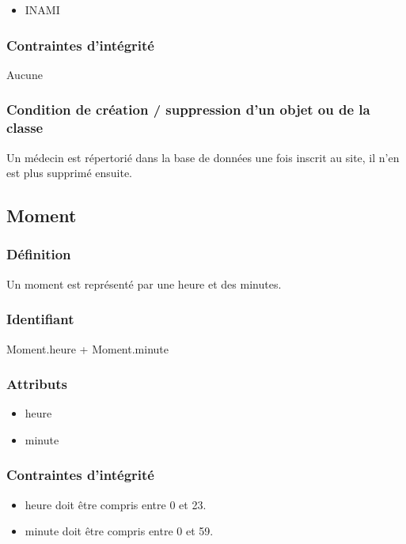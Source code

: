 \documentclass[a4paper, 11pt]{report}
\begin{document}
\begin{itemize}
    \item INAMI
\end{itemize}

\subsubsection{Contraintes d'intégrité}

Aucune

\subsubsection{Condition de création / suppression d'un objet ou de la classe}

Un médecin est répertorié dans la base de données une fois inscrit au site, il n'en est plus supprimé ensuite.

\subsection{Moment}

\subsubsection{Définition}

Un moment est représenté par une heure et des minutes.

\subsubsection{Identifiant}

Moment.heure + Moment.minute

\subsubsection{Attributs}

\begin{itemize}
    \item{heure}
    \item{minute}
\end{itemize}

\subsubsection{Contraintes d'intégrité}

\begin{itemize}
    \item heure doit être compris entre 0 et 23.
    \item minute doit être compris entre 0 et 59.
\end{itemize}
\end{document}
